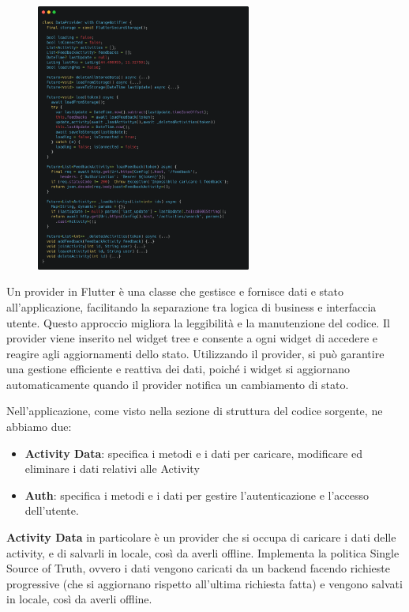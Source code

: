 \documentclass[a4paper,12pt]{article}
\begin{document}
\begin{figure}
    \includegraphics[width=0.63\textwidth]{img/data_provider.png}
\end{figure}
Un provider in Flutter è una classe che gestisce e fornisce dati e stato all'applicazione, facilitando la separazione tra logica di business e interfaccia utente. Questo approccio migliora la leggibilità e la manutenzione del codice. Il provider viene inserito nel widget tree e consente a ogni widget di accedere e reagire agli aggiornamenti dello stato. Utilizzando il provider, si può garantire una gestione efficiente e reattiva dei dati, poiché i widget si aggiornano automaticamente quando il provider notifica un cambiamento di stato. 

Nell'applicazione, come visto nella sezione di struttura del codice sorgente, ne abbiamo due:

\begin{itemize}
    \item \textbf{Activity Data}: specifica i metodi e i dati per caricare, modificare ed eliminare i dati relativi alle Activity
    \item \textbf{Auth}: specifica i metodi e i dati per gestire l'autenticazione e l'accesso dell'utente.
\end{itemize}

\textbf{Activity Data} in particolare è un provider che si occupa di caricare i dati delle activity, e di salvarli in locale, così da averli offline.
Implementa la politica Single Source of Truth, ovvero i dati vengono caricati da un backend facendo richieste progressive (che si aggiornano rispetto all'ultima richiesta fatta) e vengono salvati in locale, così da averli offline.
\end{document}
